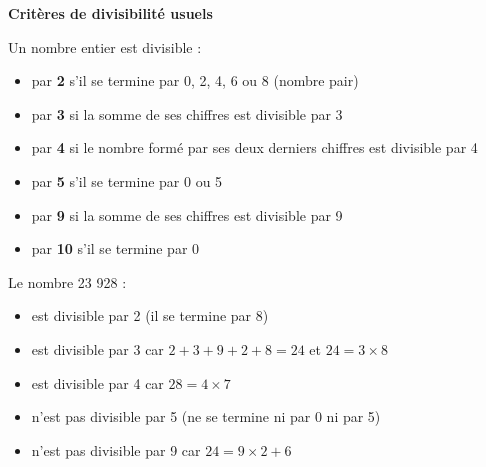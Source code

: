 \begin{criterebox}
	\textbf{Critères de divisibilité usuels}
	
	Un nombre entier est divisible :
	\begin{itemize}[label = \textbullet]
		\item par \textbf{2} s'il se termine par 0, 2, 4, 6 ou 8 (nombre pair)
		\item par \textbf{3} si la somme de ses chiffres est divisible par 3
		\item par \textbf{4} si le nombre formé par ses deux derniers chiffres est divisible par 4
		\item par \textbf{5} s'il se termine par 0 ou 5
		\item par \textbf{9} si la somme de ses chiffres est divisible par 9
		\item par \textbf{10} s'il se termine par 0
	\end{itemize}
\end{criterebox}

\begin{examplebox}
	Le nombre 23 928 :
	\begin{itemize}[label = \textbullet]
		\item est divisible par 2 (il se termine par 8)
		\item est divisible par 3 car $2+3+9+2+8 = 24$ et $24 = 3 \times 8$
		\item est divisible par 4 car $28 = 4 \times 7$
		\item n'est pas divisible par 5 (ne se termine ni par 0 ni par 5)
		\item n'est pas divisible par 9 car $24 = 9 \times 2 + 6$
	\end{itemize}
\end{examplebox}

